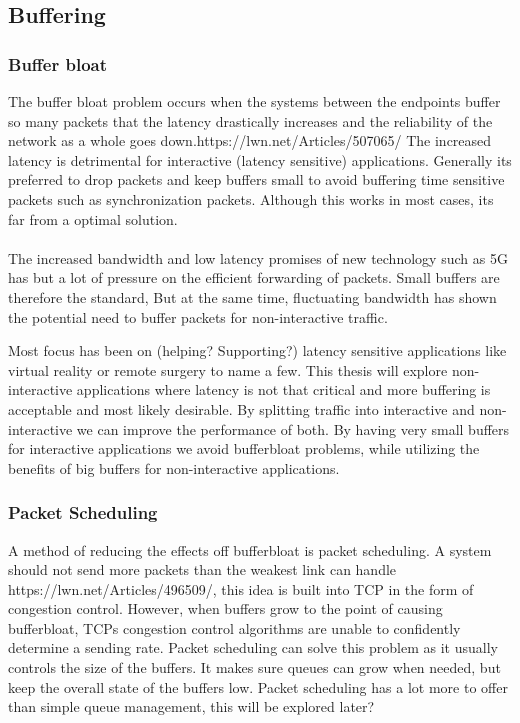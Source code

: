 \documentclass[a4paper,english, 11pt]{report}
\begin{document}
\subsection{Buffering}
\subsubsection{Buffer bloat}
The buffer bloat problem occurs when the systems between the endpoints buffer so many packets that the latency drastically increases and the reliability of the network as a whole goes down.{https://lwn.net/Articles/507065/} The increased latency is detrimental for interactive (latency sensitive) applications. Generally its preferred to drop packets and keep buffers small to avoid buffering time sensitive packets such as synchronization packets. Although this works in most cases, its far from a optimal solution.\\\\

The increased bandwidth and low latency promises of new technology such as 5G has but a lot of pressure on the efficient forwarding of packets. Small buffers are therefore the standard, But at the same time, fluctuating bandwidth has shown the potential need to buffer packets for non-interactive traffic.

Most focus has been on (helping? Supporting?) latency sensitive applications like virtual reality or remote surgery to name a few. This thesis will explore non-interactive applications where latency is not that critical and more buffering is acceptable and most likely desirable. By splitting traffic into interactive and non-interactive we can improve the performance of both. By having very small buffers for interactive applications we avoid bufferbloat problems, while utilizing the benefits of big buffers for non-interactive applications.\\

\subsubsection{Packet Scheduling}
A method of reducing the effects off bufferbloat is packet scheduling. A system should not send more packets than the weakest link can handle {https://lwn.net/Articles/496509/}, this idea is built into TCP in the form of congestion control. However, when buffers grow to the point of causing bufferbloat, TCPs congestion control algorithms are unable to confidently determine a sending rate. Packet scheduling can solve this problem as it usually controls the size of the buffers. It makes sure queues can grow when needed, but keep the overall state of the buffers low. Packet scheduling has a lot more to offer than simple queue management, this will be explored later?\\
\end{document}
